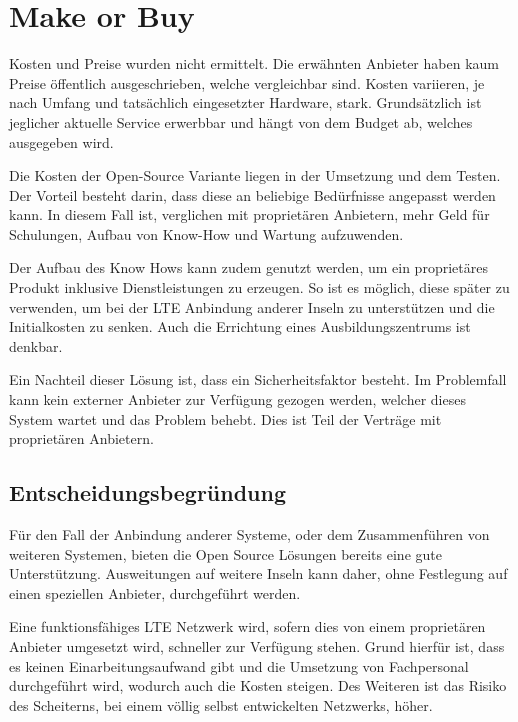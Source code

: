 
%
%
% 
% 
% 

\section{Make or Buy}
\label{sec:make_buy}

Kosten und Preise wurden nicht ermittelt. Die erwähnten Anbieter haben kaum Preise öffentlich ausgeschrieben, welche vergleichbar sind. Kosten variieren, je nach Umfang und tatsächlich eingesetzter Hardware, stark. Grundsätzlich ist jeglicher aktuelle Service erwerbbar und hängt von dem Budget ab, welches ausgegeben wird.

Die Kosten der Open-Source Variante liegen in der Umsetzung und dem Testen. Der Vorteil besteht darin, dass diese an beliebige Bedürfnisse angepasst werden kann. In diesem Fall ist, verglichen mit proprietären Anbietern, mehr Geld für Schulungen, Aufbau von Know-How und Wartung aufzuwenden. 

Der Aufbau des Know Hows kann zudem genutzt werden, um ein proprietäres Produkt inklusive Dienstleistungen zu erzeugen. So ist es möglich, diese später zu verwenden, um bei der LTE Anbindung anderer Inseln zu unterstützen und die Initialkosten zu senken. Auch die Errichtung eines Ausbildungszentrums ist denkbar.

Ein Nachteil dieser Lösung ist, dass ein Sicherheitsfaktor besteht. Im Problemfall kann kein externer Anbieter zur Verfügung gezogen werden, welcher dieses System wartet und das Problem behebt. Dies ist Teil der Verträge mit proprietären Anbietern.

\subsection{Entscheidungsbegründung}
Für den Fall der Anbindung anderer Systeme, oder dem Zusammenführen von weiteren Systemen, bieten die Open Source Lösungen bereits eine gute Unterstützung. Ausweitungen auf weitere Inseln kann daher, ohne Festlegung auf einen speziellen Anbieter, durchgeführt werden.

Eine funktionsfähiges LTE Netzwerk wird, sofern dies von einem proprietären Anbieter umgesetzt wird, schneller zur Verfügung stehen. Grund hierfür ist, dass es keinen Einarbeitungsaufwand gibt und die Umsetzung von Fachpersonal durchgeführt wird, wodurch auch die Kosten steigen.
Des Weiteren ist das Risiko des Scheiterns, bei einem völlig selbst entwickelten Netzwerks, höher.

